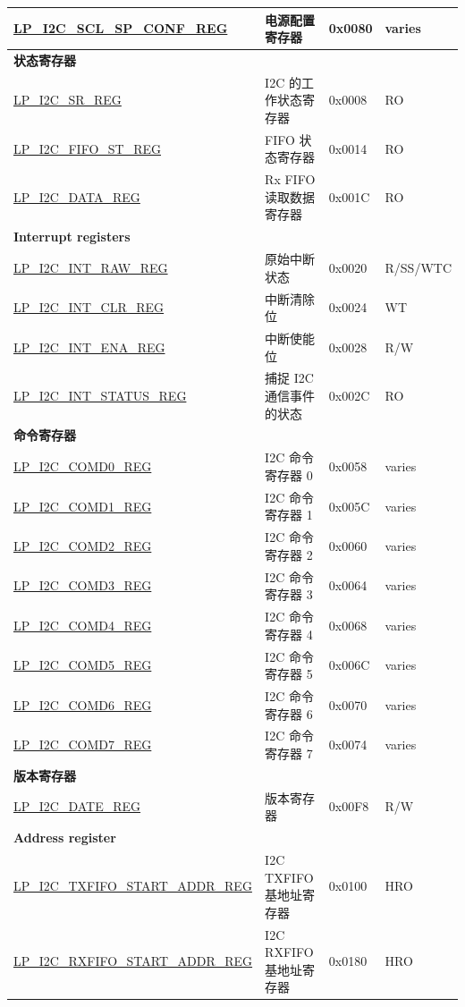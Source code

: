 \begin{longtable}{ | p{6cm} | p{7cm} | p{1.3cm} | p{1cm} | }
\hyperref[regdesc:LPI2CSCLSPCONFREG]{LP\_I2C\_SCL\_SP\_CONF\_REG} & 电源配置寄存器 & 0x0080 & varies \\ \hline
\multicolumn{4}{|l|}{\textbf{状态寄存器}} \\ \hline
\hyperref[regdesc:LPI2CSRREG]{LP\_I2C\_SR\_REG} & I2C 的工作状态寄存器 & 0x0008 & RO \\ \hline
\hyperref[regdesc:LPI2CFIFOSTREG]{LP\_I2C\_FIFO\_ST\_REG} & FIFO 状态寄存器 & 0x0014 & RO \\ \hline
\hyperref[regdesc:LPI2CDATAREG]{LP\_I2C\_DATA\_REG} & Rx FIFO 读取数据寄存器 & 0x001C & RO \\ \hline
\multicolumn{4}{|l|}{\textbf{Interrupt registers}} \\ \hline
\hyperref[regdesc:LPI2CINTRAWREG]{LP\_I2C\_INT\_RAW\_REG} & 原始中断状态 & 0x0020 & R/SS/WTC \\ \hline
\hyperref[regdesc:LPI2CINTCLRREG]{LP\_I2C\_INT\_CLR\_REG} & 中断清除位 & 0x0024 & WT \\ \hline
\hyperref[regdesc:LPI2CINTENAREG]{LP\_I2C\_INT\_ENA\_REG} & 中断使能位 & 0x0028 & R/W \\ \hline
\hyperref[regdesc:LPI2CINTSTATUSREG]{LP\_I2C\_INT\_STATUS\_REG} & 捕捉 I2C 通信事件的状态 & 0x002C & RO \\ \hline
\multicolumn{4}{|l|}{\textbf{命令寄存器}} \\ \hline
\hyperref[regdesc:LPI2CCOMD0REG]{LP\_I2C\_COMD0\_REG} & I2C 命令寄存器 0 & 0x0058 & varies \\ \hline
\hyperref[regdesc:LPI2CCOMD1REG]{LP\_I2C\_COMD1\_REG} & I2C 命令寄存器 1 & 0x005C & varies \\ \hline
\hyperref[regdesc:LPI2CCOMD2REG]{LP\_I2C\_COMD2\_REG} & I2C 命令寄存器 2 & 0x0060 & varies \\ \hline
\hyperref[regdesc:LPI2CCOMD3REG]{LP\_I2C\_COMD3\_REG} & I2C 命令寄存器 3 & 0x0064 & varies \\ \hline
\hyperref[regdesc:LPI2CCOMD4REG]{LP\_I2C\_COMD4\_REG} & I2C 命令寄存器 4 & 0x0068 & varies \\ \hline
\hyperref[regdesc:LPI2CCOMD5REG]{LP\_I2C\_COMD5\_REG} & I2C 命令寄存器 5 & 0x006C & varies \\ \hline
\hyperref[regdesc:LPI2CCOMD6REG]{LP\_I2C\_COMD6\_REG} & I2C 命令寄存器 6 & 0x0070 & varies \\ \hline
\hyperref[regdesc:LPI2CCOMD7REG]{LP\_I2C\_COMD7\_REG} & I2C 命令寄存器 7 & 0x0074 & varies \\ \hline
\multicolumn{4}{|l|}{\textbf{版本寄存器}} \\ \hline
\hyperref[regdesc:LPI2CDATEREG]{LP\_I2C\_DATE\_REG} & 版本寄存器 & 0x00F8 & R/W \\ \hline
\multicolumn{4}{|l|}{\textbf{Address register}} \\ \hline
\hyperref[regdesc:LPI2CTXFIFOSTARTADDRREG]{LP\_I2C\_TXFIFO\_START\_ADDR\_REG} & I2C TXFIFO 基地址寄存器 & 0x0100 & HRO \\ \hline
\hyperref[regdesc:LPI2CRXFIFOSTARTADDRREG]{LP\_I2C\_RXFIFO\_START\_ADDR\_REG} & I2C RXFIFO 基地址寄存器 & 0x0180 & HRO \\ \hline
\end{longtable}
